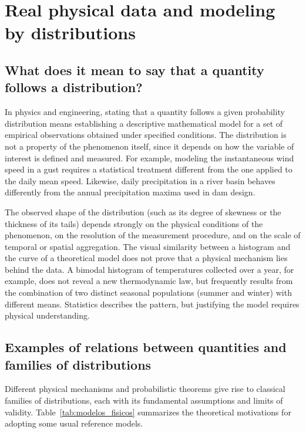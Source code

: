 \section{Real physical data and modeling by distributions}\label{sec:dados}

\subsection{What does it mean to say that a quantity follows a distribution?}

In physics and engineering, stating that a quantity follows a given probability distribution means establishing a descriptive mathematical model for a set of empirical observations obtained under specified conditions. The distribution is not a property of the phenomenon itself, since it depends on how the variable of interest is defined and measured. For example, modeling the instantaneous wind speed in a gust requires a statistical treatment different from the one applied to the daily mean speed. Likewise, daily precipitation in a river basin behaves differently from the annual precipitation maxima used in dam design.

The observed shape of the distribution (such as its degree of skewness or the thickness of its tails) depends strongly on the physical conditions of the phenomenon, on the resolution of the measurement procedure, and on the scale of temporal or spatial aggregation. The visual similarity between a histogram and the curve of a theoretical model does not prove that a physical mechanism lies behind the data. A bimodal histogram of temperatures collected over a year, for example, does not reveal a new thermodynamic law, but frequently results from the combination of two distinct seasonal populations (summer and winter) with different means. Statistics describes the pattern, but justifying the model requires physical understanding.

\subsection{Examples of relations between quantities and families of distributions}

Different physical mechanisms and probabilistic theorems give rise to classical families of distributions, each with its fundamental assumptions and limits of validity. Table~\ref{tab:modelos_fisicos} summarizes the theoretical motivations for adopting some usual reference models.

